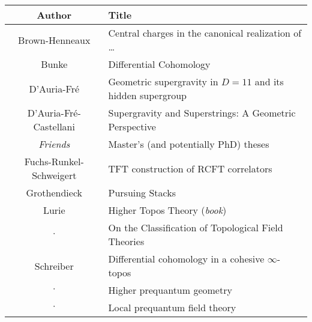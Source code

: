\documentclass[11pt, a4paper]{report}
\begin{document}
    \begin{center}
        \begin{tabular}{|c|l|}
            \hline
            Author&Title\\
            \hline
            Brown-Henneaux&Central charges in the canonical realization of \ldots\\
			Bunke&Differential Cohomology\\
			D'Auria-Fr\'e&Geometric supergravity in $D=11$ and its hidden supergroup\\
			D'Auria-Fr\'e-Castellani&Supergravity and Superstrings: A Geometric Perspective\\
            \textit{Friends}&Master's (and potentially PhD) theses\\
            Fuchs-Runkel-Schweigert&TFT construction of RCFT correlators\\
            Grothendieck&Pursuing Stacks\\
            Lurie&Higher Topos Theory (\textit{book})\\
            $\cdot$&On the Classification of Topological Field Theories\\
            Schreiber&Differential cohomology in a cohesive $\infty$-topos\\
            $\cdot$&Higher prequantum geometry\\
            $\cdot$&Local prequantum field theory\\
            \hline
        \end{tabular}
    \end{center}

%
%

%

\nomenclature[S_zsyminto]{$]a,b[$}{open interval}

\printnomenclature

\nocite{*}



\printindex
\end{document}
